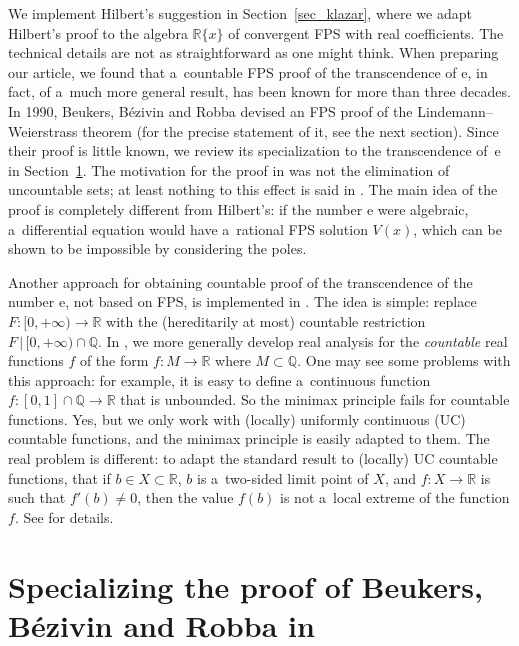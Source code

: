 \documentclass[10pt]{article}
\def\Q{\mathbb{Q}}
\def\R{\mathbb{R}}
\def\sus{\subset}
\def\cc{\colon}
\begin{document}
We implement Hilbert's suggestion in Section~\ref{sec_klazar}, where we adapt Hilbert's proof to the algebra 
$\R\{x\}$ of convergent FPS with real coefficients. The technical details are not as 
straightforward as one might think. When preparing our article, we found that a~countable FPS proof of the transcendence of 
$\mathrm{e}$, in fact, of a~much more general result, has been known for more than three decades. In 1990, Beukers, B\'ezivin 
and Robba \cite{beuk_al} devised an FPS proof of the Lindemann--Weierstrass theorem (for the precise statement of it, see the next 
section). Since their proof is little known, we review its specialization to the transcendence of~$\mathrm{e}$ in 
Section~\ref{sec_beukers}. The motivation for the proof in \cite{beuk_al} was not the elimination of uncountable sets; at 
least nothing to this effect is said in \cite{beuk_al}. The 
main idea of the proof is completely different from Hilbert's: if the 
number $\mathrm{e}$ were algebraic, a~differential equation would have 
a~rational FPS solution $V(x)$,  which can be shown to be impossible 
by considering the poles. 

Another approach for obtaining countable proof of the transcendence of the number $\mathrm{e}$, not based on FPS, is implemented 
in \cite{klaz}. The idea is simple: replace 
$F\cc[0,+\infty)\to\R$ with the (hereditarily at most) countable restriction 
$F\,|\,[0,+\infty)\cap\Q$. In \cite{klaz}, we more generally develop real analysis for the {\em countable} real functions 
$f$ of the form $f\cc M\to\R$ where $M\sus\Q$. One may see some problems with this approach: for example, it is easy to 
define a~continuous function $f\cc[0,1]\cap\Q\to\R$ that is unbounded. So the minimax principle fails for 
countable functions. Yes, but we only work with (locally) uniformly continuous (UC) countable functions, and the 
minimax principle is easily adapted to them. The real problem is different: to adapt the standard result to (locally) UC  countable functions, that if $b\in X\sus\R$, $b$ 
is a~two-sided limit point of $X$, and $f\cc X\to\R$ is such that
$f'(b)\ne0$, then the value $f(b)$ is not a~local extreme of the function 
$f$.  See \cite{klaz} for details.



\section{Specializing the proof of Beukers, B\'ezivin and Robba in \cite{beuk_al}}\label{sec_beukers}
\end{document}
